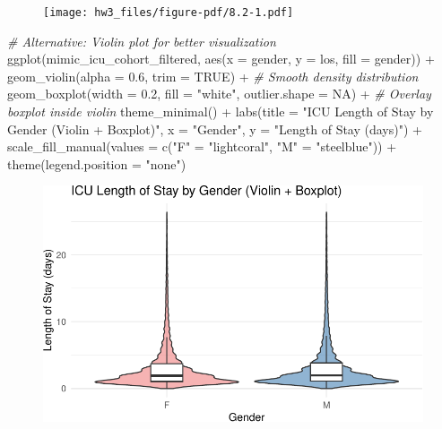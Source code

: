 \documentclass[
]{article}
\newenvironment{Shaded}{\begin{snugshade}}{\end{snugshade}}
\newcommand{\AttributeTok}[1]{\textcolor[rgb]{0.77,0.63,0.00}{#1}}
\newcommand{\CommentTok}[1]{\textcolor[rgb]{0.56,0.35,0.01}{\textit{#1}}}
\newcommand{\ConstantTok}[1]{\textcolor[rgb]{0.00,0.00,0.00}{#1}}
\newcommand{\FloatTok}[1]{\textcolor[rgb]{0.00,0.00,0.81}{#1}}
\newcommand{\FunctionTok}[1]{\textcolor[rgb]{0.00,0.00,0.00}{#1}}
\newcommand{\NormalTok}[1]{\textcolor[rgb]{0.00,0.00,0.00}{#1}}
\newcommand{\OtherTok}[1]{\textcolor[rgb]{0.56,0.35,0.01}{#1}}
\newcommand{\SpecialCharTok}[1]{\textcolor[rgb]{0.00,0.00,0.00}{#1}}
\newcommand{\StringTok}[1]{\textcolor[rgb]{0.31,0.60,0.02}{#1}}
\begin{document}
\begin{figure}[H]

{\centering \texttt{[image: hw3\_files/figure-pdf/8.2-1.pdf]}

}

\end{figure}

\begin{Shaded}
\begin{Highlighting}[]
\CommentTok{\# Alternative: Violin plot for better visualization}
\FunctionTok{ggplot}\NormalTok{(mimic\_icu\_cohort\_filtered, }\FunctionTok{aes}\NormalTok{(}\AttributeTok{x =}\NormalTok{ gender, }\AttributeTok{y =}\NormalTok{ los, }\AttributeTok{fill =}\NormalTok{ gender)) }\SpecialCharTok{+}
  \FunctionTok{geom\_violin}\NormalTok{(}\AttributeTok{alpha =} \FloatTok{0.6}\NormalTok{, }\AttributeTok{trim =} \ConstantTok{TRUE}\NormalTok{) }\SpecialCharTok{+}  \CommentTok{\# Smooth density distribution}
  \FunctionTok{geom\_boxplot}\NormalTok{(}\AttributeTok{width =} \FloatTok{0.2}\NormalTok{, }\AttributeTok{fill =} \StringTok{"white"}\NormalTok{, }\AttributeTok{outlier.shape =} \ConstantTok{NA}\NormalTok{) }\SpecialCharTok{+}  
  \CommentTok{\# Overlay boxplot inside violin}
  \FunctionTok{theme\_minimal}\NormalTok{() }\SpecialCharTok{+}
  \FunctionTok{labs}\NormalTok{(}\AttributeTok{title =} \StringTok{"ICU Length of Stay by Gender (Violin + Boxplot)"}\NormalTok{, }
       \AttributeTok{x =} \StringTok{"Gender"}\NormalTok{, }\AttributeTok{y =} \StringTok{"Length of Stay (days)"}\NormalTok{) }\SpecialCharTok{+}
  \FunctionTok{scale\_fill\_manual}\NormalTok{(}\AttributeTok{values =} \FunctionTok{c}\NormalTok{(}\StringTok{"F"} \OtherTok{=} \StringTok{"lightcoral"}\NormalTok{, }\StringTok{"M"} \OtherTok{=} \StringTok{"steelblue"}\NormalTok{)) }\SpecialCharTok{+}  
  \FunctionTok{theme}\NormalTok{(}\AttributeTok{legend.position =} \StringTok{"none"}\NormalTok{)}
\end{Highlighting}
\end{Shaded}

\begin{figure}[H]

{\centering \includegraphics{hw3_files/figure-pdf/8.2-2.pdf}

}

\end{figure}
\end{document}
